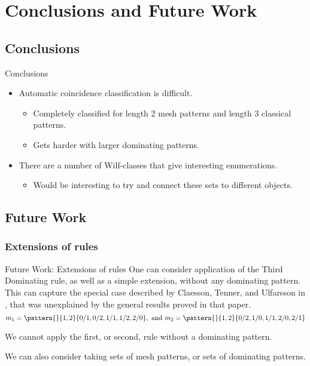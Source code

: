 \section{Conclusions and Future Work}
\label{sec:Conclusions and Future Work}
\subsection{Conclusions}
\label{sub:Conclusions}
\begin{frame}{Conclusions}
  \begin{itemize}
  \item Automatic coincidence classification is difficult.
  \begin{itemize}
    \item Completely classified for length 2 mesh patterns and length 3 classical patterns.
    \item Gets harder with larger dominating patterns.
  \end{itemize}
  \item There are a number of Wilf-classes that give interesting
  enumerations.
  \begin{itemize}
    \item Would be interesting to try and connect these sets to different objects.
  \end{itemize}
  \end{itemize}
\end{frame}
\subsection{Future Work}
\label{sub:Future Work}
\subsubsection{Extensions of rules}
\label{subs:Extensions of rules}
\begin{frame}{Future Work: Extensions of rules}
    One can consider application of the Third Dominating rule, as well as a
    simple extension, without any dominating pattern. This can capture the special
    case described by Claesson, Tenner, and Ulfarsson in \cite{ABH}, that was
    unexplained by the general results proved in that paper.
    \begin{equation*}
     m_1 = \pattern{}{1,2}{0/1,0/2,1/1,1/2,2/0}, \text{ and } m_2 = \pattern{}{1,2}{0/2,1/0,1/1,2/0,2/1}
   \end{equation*}

   We cannot apply the first, or second, rule without a dominating pattern.

   We can also consider taking sets of mesh patterns, or sets of dominating patterns.
\end{frame}

